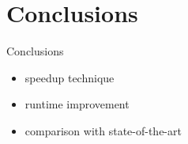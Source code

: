 \documentclass[pdf,xcolor={dvipsnames}]{beamer}
\begin{document}
\section{Conclusions}
	\begin{frame}{Conclusions}
		\begin{itemize}
		\item speedup technique
		\item runtime improvement
		\item comparison with state-of-the-art
		\end{itemize}
		\end{frame}
\end{document}
